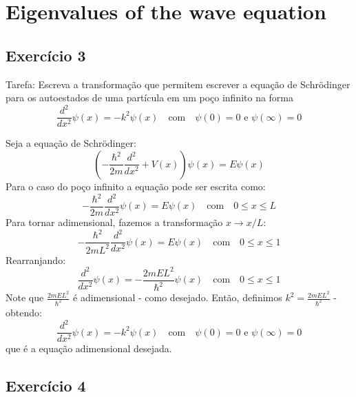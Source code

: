\documentclass[12pt, a4paper]{article} %
\begin{document}
\section{Eigenvalues of the wave equation}

    \subsection{Exerc\'icio 3}

        Tarefa: Escreva a transforma\c{c}\~ao que permitem escrever a equa\c{c}\~ao de Schr\"odinger para os
        autoestados de uma part\'icula em um po\c{c}o infinito na forma
        \begin{equation}
            \frac{d^2}{dx^2}\psi(x) = -k^2\psi(x) \quad \text{com} \quad \psi(0) = 0 \text{ e } \psi(\infty) = 0
        \end{equation}

        Seja a equação de Schr\"odinger:
        \begin{equation}
                \left(-\frac{\hbar^2}{2m}\frac{d^2}{dx^2} + V(x)\right)\psi(x) = E\psi(x)
        \end{equation}
        Para o caso do po\c{c}o infinito a equa\c{c}\~ao pode ser escrita como:
        \begin{equation}
                -\frac{\hbar^2}{2m}\frac{d^2}{dx^2}\psi(x) = E\psi(x) \quad \text{com} \quad 0 \leq x \leq L 
        \end{equation}
        Para tornar adimensional, fazemos a transforma\c{c}\~ao $x \longrightarrow x/L$:
        \begin{equation}
                -\frac{\hbar^2}{2mL^2}\frac{d^2}{dx^2}\psi(x) = E\psi(x) \quad \text{com} \quad 0 \leq x \leq 1
        \end{equation}
        Rearranjando:
        \begin{equation}
            \frac{d^2}{dx^2}\psi(x) = -\frac{2mEL^2}{\hbar^2}\psi(x) \quad \text{com} \quad 0 \leq x \leq 1
        \end{equation}
        Note que $\frac{2mEL^2}{\hbar^2}$ \'e adimensional - como desejado. Ent\~ao, definimos $k^2 = \frac{2mEL^2}{\hbar^2}$ - obtendo:
        \begin{equation}
            \frac{d^2}{dx^2}\psi(x) = -k^2\psi(x) \quad \text{com} \quad \psi(0) = 0 \text{ e } \psi(\infty) = 0
        \end{equation}
        que \'e a equa\c{c}\~ao adimensional desejada.


    \subsection{Exerc\'icio 4}
\end{document}
